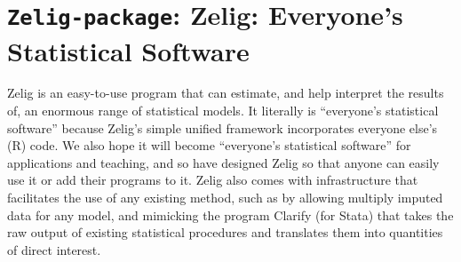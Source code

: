  \section{{\tt Zelig-package}: Zelig: Everyone's Statistical Software}\label{ss:Zelig.Rdash.package}
\begin{Description}\relax
Zelig is an easy-to-use program that can estimate, and
help interpret the results of, an enormous range of statistical
models. It literally is ``everyone's statistical software''
because Zelig's simple unified framework incorporates everyone
else's (R) code. We also hope it will become ``everyone's
statistical software'' for applications and teaching, and so
have designed Zelig so that anyone can easily use it or add
their programs to it.  Zelig also comes with infrastructure
that facilitates the use of any existing method, such as by
allowing multiply imputed data for any model, and mimicking the
program Clarify (for Stata) that takes the raw output of
existing statistical procedures and translates them into
quantities of direct interest.
\end{Description}
